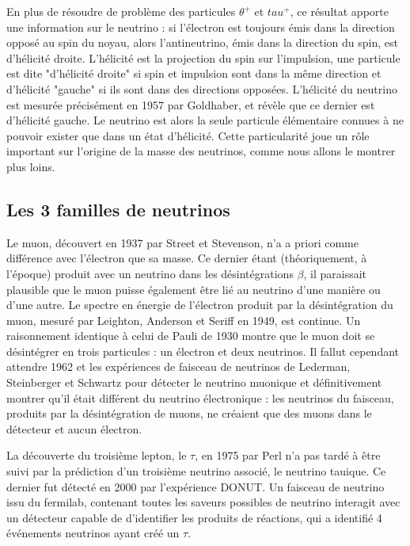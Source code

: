 			En plus de résoudre de problème des particules $\theta^+$ et $tau^+$, ce résultat apporte une information sur le neutrino : si l'électron est toujours émis dans la direction opposé au spin du noyau, alors l'antineutrino, émis dans la direction du spin, est d'hélicité droite. L'hélicité est la projection du spin sur l'impulsion, une particule est dite "d'hélicité droite" si spin et impulsion sont dans la même direction et d'hélicité "gauche" si ils sont dans des directions opposées. L'hélicité du neutrino est mesurée précisément en 1957 par Goldhaber\cite{ref_needed}, et révèle que ce dernier est d'hélicité gauche. Le neutrino est alors la seule particule élémentaire connues à ne pouvoir exister que dans un état d'hélicité. Cette particularité joue un rôle important sur l'origine de la masse des neutrinos, comme nous allons le montrer plus loins.
    
        \subsection{Les 3 familles de neutrinos}
        
	        Le muon, découvert en 1937 par Street et Stevenson\cite{Street1937}, n'a a priori comme différence avec l'électron que sa masse. Ce dernier étant (théoriquement, à l'époque) produit avec un neutrino dans les désintégrations $\beta$, il paraissait plausible que le muon puisse également être lié au neutrino d'une manière ou d'une autre.  Le spectre en énergie de l'électron produit par la désintégration du muon, mesuré par Leighton, Anderson et Seriff en 1949\cite{Leighton1949}, est continue. Un raisonnement identique à celui de Pauli de 1930 montre que le muon doit se désintégrer en trois particules : un électron et deux neutrinos. Il fallut cependant attendre 1962 et les expériences de faisceau de neutrinos de Lederman, Steinberger et Schwartz\cite{Danby1962} pour détecter le neutrino muonique et définitivement montrer qu'il était différent du neutrino électronique : les neutrinos du faisceau, produits par la désintégration de muons, ne créaient que des muons dans le détecteur et aucun électron.
	        
	        La découverte du troisième lepton, le $\tau$, en 1975 par Perl\cite{Perl1975} n'a pas tardé à être suivi par la prédiction d'un troisième neutrino associé, le neutrino tauique. Ce dernier fut détecté en 2000 par l'expérience DONUT\cite{Collaboration2000}. Un faisceau de neutrino issu du fermilab, contenant toutes les saveurs possibles de neutrino interagit avec un détecteur capable de d'identifier les produits de réactions, qui a identifié 4 événements neutrinos ayant créé un $\tau$.
	        
